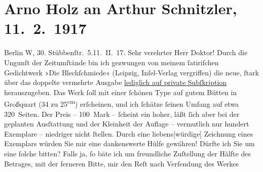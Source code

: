 

         \renewcommand{\erwaehnteInstitutionen}{Institutionen: Insel-Verlag, Petzschke {\kaufmannsund}  Gretschel}
         \renewcommand{\erwaehnteOrte}{Orte: Berlin, Dresden, Leipzig, Stübbenstraße, Wien}
         \renewcommand{\erwaehnteWerke}{Werke: Die Blechschmiede}
               \section[Arno Holz an Arthur Schnitzler, 11. 2. 1917]{ Arno Holz an Arthur Schnitzler, 11. 2. 1917}\nopagebreak{}\rehead{ }\begin{ledgroupsized}[t]{13cm}\normalsize\beginnumbering \toendnotes[C]{\smallbreak\pagebreak[2]} 
\pstart
           \raggedleft{}{\pb}Berlin W, 30. Stübbenſtr. 5.\hspace*{1.5em}11. II. 17. \pend
           \pstart\center{}Sehr verehrter Herr Doktor!\pend\pstart
           Durch die Ungunſt der Zeitumſtände bin ich gezwungen von meinem ſatiriſchen
               Gedichtwerk »Die Blechſchmiede« (Leipzig, Inſel-Verlag vergriffen) die neue, ſtark über das doppelte vermehrte Ausgabe
                  \uline{lediglich auf private Subſkription} herauszugeben.
               Das Werk ſoll mit einer ſchönen Type auf gutem Bütten in Großquart (34 zu 25\textsuperscript{cm}) erſcheinen, und ich ſchätze ſeinen Umfang auf etwa
               320 Seiten. Der Preis – 100 Mark – ſcheint ein hoher, läßt ſich aber bei der
               geplanten Ausſtattung und der Kleinheit der Auflage – vermutlich nur hundert
               Exemplare – niedriger nicht ſtellen. Durch eine liebens{[}würdige{]}
               Zeichnung eines Exemplars würden Sie mir eine dankenswerte Hülfe gewähren! Dürfte ich
               Sie um eine ſolche bitten? Falls ja, ſo bäte ich um freundliche Zuſtellung der Hälfte
               des Betrages, mit der ferneren Bitte, mir den Reſt nach Verſendung des Werkes

\end{ledgroupsized}
